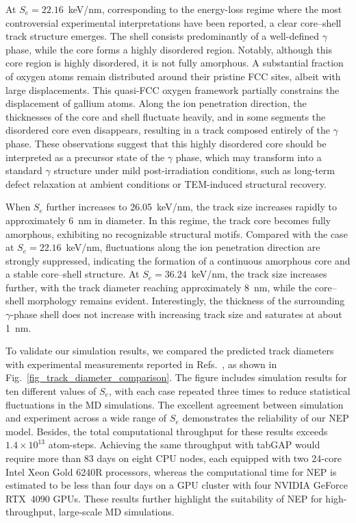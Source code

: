 \documentclass[%
reprint,
superscriptaddress,
 amsmath,amssymb,
 aps,
]{revtex4-2}
\begin{document}
At $S_e = 22.16$~keV/nm, corresponding to the energy-loss regime where the most
controversial experimental interpretations have been reported, a clear core--shell
track structure emerges.
The shell consists predominantly of a well-defined $\gamma$ phase, while the core
forms a highly disordered region.
Notably, although this core region is highly disordered, it is not fully amorphous.
A substantial fraction of oxygen atoms remain distributed around their pristine
FCC sites, albeit with large displacements.
This quasi-FCC oxygen framework partially constrains the displacement of gallium atoms.
Along the ion penetration direction, the thicknesses of the core and shell
fluctuate heavily, and in some segments the disordered core even disappears, resulting in
a track composed entirely of the $\gamma$ phase.
These observations suggest that this highly disordered core should be interpreted
as a precursor state of the $\gamma$ phase, which may transform into a standard 
$\gamma$ structure under mild post-irradiation conditions, such as
long-term defect relaxation at ambient conditions or TEM-induced structural recovery.

When $S_e$ further increases to 26.05~keV/nm, the track size increases rapidly to 
approximately 6~nm in diameter.
In this regime, the track core becomes fully amorphous, exhibiting no recognizable
structural motifs.
Compared with the case at $S_e = 22.16$~keV/nm, fluctuations along the ion penetration
direction are strongly suppressed, indicating the formation of a continuous amorphous
core and a stable core--shell structure.
At $S_e = 36.24$~keV/nm, the track size increases further, with the track diameter
reaching approximately 8~nm, while the core--shell morphology remains evident.
Interestingly, the thickness of the surrounding $\gamma$-phase shell does not
increase with increasing track size and saturates at about 1~nm.

To validate our simulation results, we compared the predicted track diameters with
experimental measurements reported in Refs.~\cite{xu_thermal_2025,ai_radiation_2019},
as shown in Fig.~\ref{fig_track_diameter_comparison}.
The figure includes simulation results for ten different values of $S_e$, with each
case repeated three times to reduce statistical fluctuations in the MD simulations. 
The excellent agreement between simulation and experiment across a wide range of $S_e$ 
demonstrates the reliability of our NEP model.
Besides, the total computational throughput for these results exceeds
$1.4\times10^{13}$ atom-steps.
Achieving the same throughput with tabGAP would require more than 83 days on eight
CPU nodes, each equipped with two 24-core Intel Xeon Gold 6240R processors, whereas
the computational time for NEP is estimated to be less than four days on a GPU 
cluster with four NVIDIA GeForce RTX~4090 GPUs.
These results further highlight the suitability of NEP for high-throughput,
large-scale MD simulations.
\end{document}
